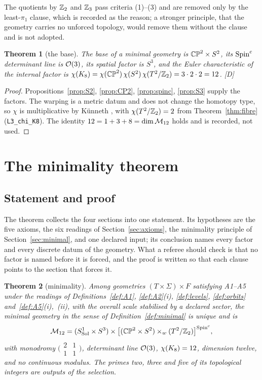 \documentclass[11pt,a4paper]{article}
\theoremstyle{plain}
\newtheorem{theorem}{Theorem}[section]
\theoremstyle{definition}
\theoremstyle{remark}
\newcommand{\Sol}{\mathrm{Sol}}
\newcommand{\rigD}{[\textup{D}]}
\begin{document}
The quotients by $\mathbb{Z}_{2}$ and $\mathbb{Z}_{3}$ pass criteria (1)--(3) and are removed only by the least-$\pi_{1}$ clause, which is recorded as the reason; a stronger principle, that the geometry carries no unforced topology, would remove them without the clause and is not adopted.

\begin{theorem}[the base]\label{thm:base}
The base of a minimal geometry is $\mathbb{CP}^2\times S^2$, its $\text{Spin}^c$ determinant line is $\mathcal{O}(3)$, its spatial factor is $S^{3}$, and the Euler characteristic of the internal factor is $\chi(K_8)=\chi(\mathbb{CP}^2)\,\chi(S^2)\,\chi(T^2/\mathbb{Z}_2)=3\cdot2\cdot2=12$. \rigD
\end{theorem}

\begin{proof}
Propositions~\ref{prop:S2}, \ref{prop:CP2}, \ref{prop:spinc}, \ref{prop:S3} supply the factors. The warping is a metric datum and does not change the homotopy type, so $\chi$ is multiplicative by K\"unneth \cite{Hatcher}, with $\chi(T^2/\mathbb{Z}_2)=2$ from Theorem~\ref{thm:fibre} (\texttt{L3\_chi\_K8}). The identity $12=1+3+8=\dim\mathcal{M}_{12}$ holds and is recorded, not used.
\end{proof}

\section{The minimality theorem}\label{sec:theorem}

\subsection{Statement and proof}

The theorem collects the four sections into one statement. Its hypotheses are the five axioms, the six readings of Section~\ref{sec:axioms}, the minimality principle of Section~\ref{sec:minimal}, and one declared input; its conclusion names every factor and every discrete datum of the geometry. What a referee should check is that no factor is named before it is forced, and the proof is written so that each clause points to the section that forces it.

\begin{theorem}[minimality]\label{thm:main}
Among geometries $(T\times\Sigma)\times F$ satisfying A1--A5 under the readings of Definitions~\ref{def:A1}, \ref{def:A2}(i), \ref{def:levels}, \ref{def:orbits} and~\ref{def:A5}(i),~(ii), with the overall scale stabilised by a declared sector, the minimal geometry in the sense of Definition~\ref{def:minimal} is unique and is
\[
\Mtwelve=(S^{1}_{\Sol}\times S^{3})\times\bigl[(\CPtwo\times\Stwo)\times_{w}(\Ttwo/\Ztwo)\bigr]^{\Spinc},
\]
with monodromy $\bigl(\begin{smallmatrix}2&1\\1&1\end{smallmatrix}\bigr)$, determinant line $\mathcal{O}(3)$, $\chi(K_8)=12$, dimension twelve, and no continuous modulus. The primes two, three and five of its topological integers are outputs of the selection.
\end{theorem}
\end{document}

